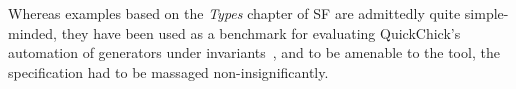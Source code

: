 Whereas examples based on the \emph{Types} chapter of SF are
admittedly quite simple-minded, they have been used as a benchmark for
evaluating \textsf{QuickChick}'s automation of generators under
invariants~\cite{LampropoulosPP18}, and to be amenable to the tool,
the specification had to be massaged non-insignificantly.


